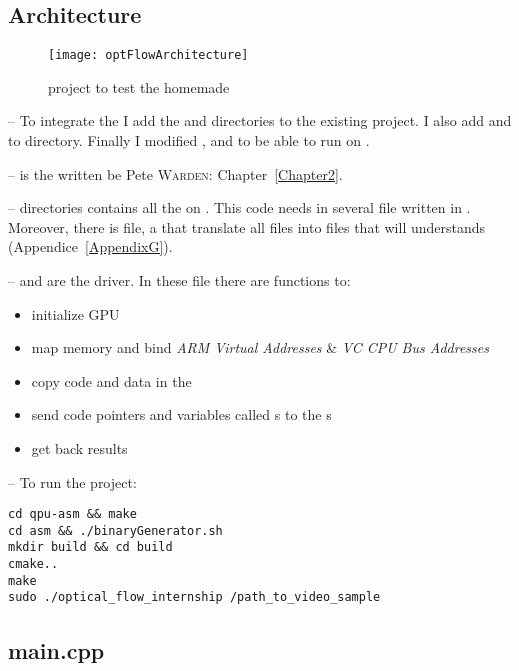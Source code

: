 \subsection{Architecture}

\begin{figure}[!htbp]
	\centering
	\texttt{[image: optFlowArchitecture]}
\caption{ project to test the homemade \api}
	\label{optFlowFig}
\end{figure}
\FloatBarrier

-- To integrate the \api{} I add the  and  directories to the existing  project. I also add  and  to  directory. Finally I modified ,  and  to be able to run \flow{}  on \vc.

--  is the  written be Pete \textsc{Warden}: Chapter~\ref{Chapter2}.

--  directories contains all the  on \vc. This code needs in several  file written in . Moreover, there is  file, a  that translate all  files into  files that \vc{} will understands (Appendice~\ref{AppendixG}).

--  and  are the  driver. In these file there are functions to:
\begin{itemize}
	\item initialize GPU
	\item map \ram{} memory and bind \emph{ARM Virtual Addresses} \& \emph{VC CPU Bus Addresses}
	\item copy code and data in the \ram
	\item send code pointers and variables called \uni{}s to the \qpu{}s
	\item get back results
\end{itemize}


-- To run the project:
\begin{lstlisting}
cd qpu-asm && make
cd asm && ./binaryGenerator.sh
mkdir build && cd build
cmake..
make
sudo ./optical_flow_internship /path_to_video_sample
\end{lstlisting}


\subsection{main.cpp}

